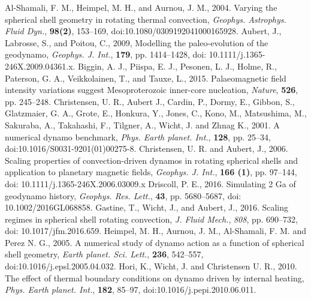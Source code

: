 \begin{thebibliography}{}
%
Al-Shamali, F. M., Heimpel, M. H., and Aurnou, J. M., 2004. Varying the spherical shell geometry in rotating thermal convection, {\it Geophys. Astrophys. Fluid Dyn.}, {\bf 98(2)}, 153--169, doi:10.1080/0309192041000165928.
%
Aubert, J., Labrosse, S., and Poitou, C., 2009, Modelling the paleo-evolution of the geodynamo, {\it Geophys. J. Int.}, {\bf 179}, pp. 1414--1428, doi: 10.1111/j.1365-246X.2009.04361.x.
%
Biggin, A. J., Piispa, E. J., Pesonen, L. J., Holme, R., Paterson, G. A., Veikkolainen, T., and Tauxe, L., 2015. Palaeomagnetic field intensity variations suggest Mesoproterozoic inner-core nucleation, {\it Nature}, {\bf 526}, pp. 245–248.
%
Christensen, U. R., Aubert J., Cardin, P., Dormy, E., Gibbon, S., Glatzmaier, G. A., Grote, E., Honkura, Y., Jones, C., Kono, M., Matsushima, M., Sakuraba, A., Takahashi, F., Tilgner, A., Wicht, J. and Zhnag K., 2001. A numerical dynamo benchmark, {\it Phys. Earth planet. Int.}, {\bf 128}, pp. 25--34, doi:10.1016/S0031-9201(01)00275-8.
%
Christensen, U. R. and Aubert, J., 2006. Scaling properties of convection-driven dynamos in rotating spherical shells and application to planetary magnetic fields, {\it Geophys. J. Int.}, {\bf 166 (1)}, pp. 97--144, doi: 10.1111/j.1365-246X.2006.03009.x
%
Driscoll, P. E., 2016. Simulating 2 Ga of geodynamo history, {\it Geophys. Res. Lett.}, {\bf 43}, pp. 5680--5687, doi: 10.1002/2016GL068858.
%
{\color{red}
Gastine, T., Wicht, J., and Aubert, J., 2016. Scaling regimes in spherical shell rotating convection, {\it J. Fluid Mech.}, {\it 808}, pp. 690--732, doi: 10.1017/jfm.2016.659.
}
%
Heimpel, M. H., Aurnou, J. M., Al-Shamali, F. M. and Perez N. G., 2005. A numerical study of dynamo action as a function of spherical shell geometry, {\it Earth planet. Sci. Lett.}, {\bf 236}, 542--557, doi:10.1016/j.epsl.2005.04.032.
%
Hori, K., Wicht, J. and Christensen U. R., 2010. The effect of thermal boundary conditions on dynamo driven by internal heating, {\it Phys. Earth planet. Int.}, {\bf 182}, 85--97, doi:10.1016/j.pepi.2010.06.011.

\end{thebibliography}
